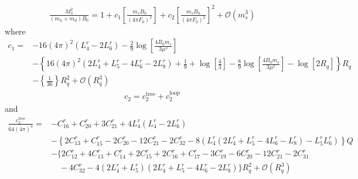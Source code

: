 \documentclass[12pt,a4paper]{article}
\begin{document}
\begin{align}
	\frac{M_{\pi}^2}{(m_u+m_d)B_0} = 1 + c_1 \left[ \frac{m_s B_0}{(4 \pi F_0)^2} \right] + c_2 \left[ \frac{m_s B_0}{(4 \pi F_0)^2} \right]^2 + \mathcal{O} (m_s^3)  \label{MpiSExp}
\end{align}
where
\begin{align}
	c_1 =& -16 (4 \pi )^2 (L_4^r - 2 L_6^r) - \frac{2}{9} \log \left[ \frac{4 B_0 m_s}{3 \mu^2} \right] \nonumber \\
	& - \left\{ 16 (4 \pi)^2 (2 L_4^r + L_5^r - 4 L_6^r -2 L_8^r ) + \frac{1}{9} + \log \left[ \frac{4}{3} \right] - \frac{8}{9} \log \left[ \frac{4 B_0 m_s}{3 \mu^2} \right] - \log \left[ 2 R_q \right] \right\} R_q \nonumber \\
	& - \left\{ \frac{1}{36} \right\} R_q^2 + \mathcal{O}(R_q^3)
\end{align}
\begin{align}	
	c_2 = c_2^{\text{tree}} + c_2^{\text{loop}}
\end{align}
and
\begin{align}
	\frac{c_2^{\text{tree}}}{64(4\pi)^4} =& -C^r_{16}+C^r_{20}+3C^r_{21} + 4 L^r_4( L^r_4 - 2 L^r_6) \nonumber \\
	& - \left\{ 2 C^r_{13}+ C^r_{15}- 2 C^r_{20}- 12 C^r_{21} - 2 C^r_{32} - 8 \left( L^r_{4} (2 L^r_{4}+L^r_{5}-4 L^r_{6}-L^r_{8})-L^r_{5} L^r_{6} \right) \right\} Q \nonumber \\
	& - \bigg\{ 2 C^r_{12}+4 C^r_{13}+C^r_{14}+2 C^r_{15}+2 C^r_{16}+C^r_{17}-3 C^r_{19}-6 C^r_{20}-12 C^r_{21}-2 C^r_{31}
 \nonumber \\	& \quad
-4 C^r_{32} - 4 \left( 2 L^r_{4}+L^r_{5} \right) \left( 2 L^r_{4}+L^r_{5}-4 L^r_{6}-2 L^r_{8} \right) \bigg\} R_q^2 + \mathcal{O} (R_q^3)
\end{align}
\end{document}
